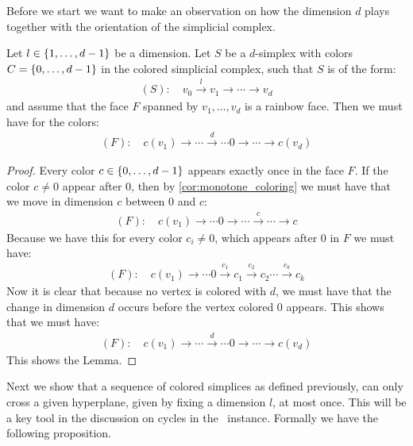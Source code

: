 Before we start we want to make an observation on how the dimension $d$ plays together with the orientation of the simplicial complex.
\begin{lemma}
    \label{lem:position_of_d_in_simplex}
    Let $l \in \left\{1, \dots, d-1\right\}$ be a dimension. Let $S$ be a $d$-simplex with colors $C = \left\{0, \dots, d-1\right\}$ in the colored simplicial complex, such that $S$ is of the form:
    \begin{align*}
        (S): \quad v_0 \xrightarrow{l} v_1 \xrightarrow{} \cdots \xrightarrow{} v_d
    \end{align*}
    and assume that the face $F$ spanned by $v_1, \dots, v_d$ is a rainbow face. Then we must have for the colors:
    \begin{align*}
        (F): \quad c(v_1) \xrightarrow{}  \cdots \xrightarrow{d} \cdots  0 \xrightarrow{} \cdots \xrightarrow{} c(v_d)
    \end{align*}
\end{lemma}
\begin{proof}
    Every color $c \in \left\{0, \dots, d-1\right\}$ appears exactly once in the face $F$. If the color $c \neq 0$ appear after $0$, then by \cref{cor:monotone_coloring} we must have that we move in dimension $c$ between $0$ and $c$:
    \begin{align*}
        (F): \quad c(v_1) \xrightarrow{} \cdots  0 \xrightarrow{} \cdots \xrightarrow{c} \cdots \xrightarrow{} c
    \end{align*}
    Because we have this for every color $c_i \neq 0$, which appears after $0$ in $F$ we must have:
    \begin{align*}
        (F): \quad c(v_1) \xrightarrow{} \cdots  0 \xrightarrow{c_1} c_1 \xrightarrow{c_2} c_2 \cdots \xrightarrow{c_k} c_k
    \end{align*}
    Now it is clear that because no vertex is colored with $d$, we must have that the change in dimension $d$ occurs before the vertex colored $0$ appears. This shows that we must have:
    \begin{align*}
        (F): \quad c(v_1) \xrightarrow{}  \cdots \xrightarrow{d} \cdots  0 \xrightarrow{} \cdots \xrightarrow{} c(v_d)
    \end{align*}
    This shows the Lemma.
\end{proof}
Next we show that a sequence of colored simplices as defined previously, can only cross a given hyperplane, given by fixing a dimension $l$, at most once. This will be a key tool in the discussion on cycles in the \EndOfLine\ instance. Formally we have the following proposition.
